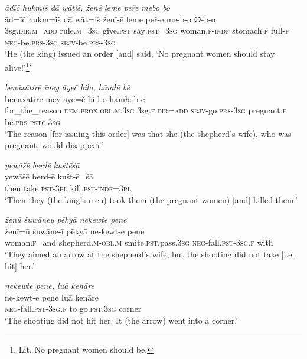 \ea \label{KŠ.17}
\textit{āđīč hukmiš dā wātiš, ženē leme peře mebo bo} \\ 
\gll āđ=īč hukm=iš dā wāt=iš ženī-ē leme peř-e me-b-o ∅-b-o \\ 
 3sg\textsc{.dir}\textsc{.m}\textsc{=add} rule\textsc{.m}\textsc{=3sg} give\textsc{.pst} say\textsc{.pst}\textsc{=3sg} woman\textsc{.f}\textsc{-indf} stomach\textsc{.f} full\textsc{-f} \textsc{neg-}be\textsc{.prs}\textsc{-3sg} \textsc{sbjv-}be\textsc{.prs}\textsc{-3sg} \\ 
\glt `He (the king) issued an order [and] said, ‘No pregnant women should stay alive!’\footnote{Lit. No pregnant women should be.}'
\z 
 
\ea \label{KŠ.18}
\textit{benāxātirē īney āyeč bilo, hāmɫē bē} \\ 
\gll benāxātirē īney āye=č bi-l-o hāmɫē b-ē \\ 
 for\_the\_reason \textsc{dem.prox}\textsc{.obl}\textsc{.m}\textsc{.3sg} 3sg\textsc{.f}\textsc{.dir}\textsc{=add} \textsc{sbjv-}go\textsc{.prs}\textsc{-3sg} pregnant\textsc{.f} be\textsc{.prs}\textsc{-pstc}\textsc{.3sg} \\ 
\glt `The reason [for issuing this order] was that she (the shepherd’s wife), who was pregnant, would disappear.'
\z 
 
\ea \label{KŠ.19}
\textit{yewāšē berdē kuštēšā} \\ 
\gll yewāšē berd-ē kušt-ē=šā \\ 
 then take\textsc{.pst}\textsc{-3pl} kill\textsc{.pst}\textsc{-indf}\textsc{=3pl} \\ 
\glt `Then they (the king’s men) took them (the pregnant women) [and] killed them.'
\z 
 
\ea \label{KŠ.20}
\textit{ženū šuwāney pēkyā nekewte pene} \\ 
\gll ženī=ū šuwāne-ī pēkyā ne-kewt-e pene \\ 
 woman\textsc{.f}=and shepherd\textsc{.m}\textsc{-obl}\textsc{.m} smite\textsc{.pst}.pass\textsc{.3sg} \textsc{neg-}fall\textsc{.pst}\textsc{-3sg}\textsc{.f} with \\ 
\glt `They aimed an arrow at the shepherd’s wife, but the shooting did not take [i.e. hit] her.'
\z 
 
\ea \label{KŠ.21}
\textit{nekewte pene, luā kenāre} \\ 
\gll ne-kewt-e pene luā kenāre \\ 
 \textsc{neg-}fall\textsc{.pst}\textsc{-3sg}\textsc{.f} to go\textsc{.pst}\textsc{.3sg} corner \\ 
\glt `The shooting did not hit her. It (the arrow) went into a corner.'
\z 
 

